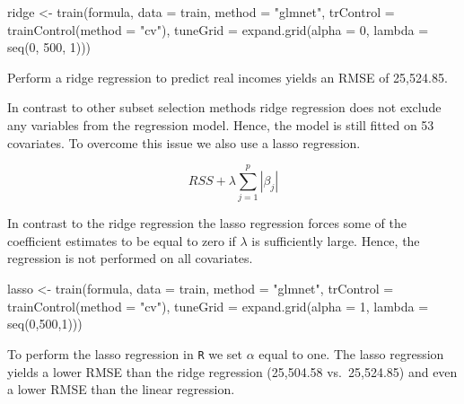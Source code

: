 \documentclass[11pt,a4paper]{article}
\newenvironment{Shaded}{\begin{snugshade}}{\end{snugshade}}
\newcommand{\AttributeTok}[1]{\textcolor[rgb]{0.77,0.63,0.00}{#1}}
\newcommand{\DecValTok}[1]{\textcolor[rgb]{0.00,0.00,0.81}{#1}}
\newcommand{\FunctionTok}[1]{\textcolor[rgb]{0.00,0.00,0.00}{#1}}
\newcommand{\NormalTok}[1]{#1}
\newcommand{\OtherTok}[1]{\textcolor[rgb]{0.56,0.35,0.01}{#1}}
\newcommand{\StringTok}[1]{\textcolor[rgb]{0.31,0.60,0.02}{#1}}
\begin{document}
\begin{Shaded}
\begin{Highlighting}[]
\NormalTok{ridge }\OtherTok{\textless{}{-}} \FunctionTok{train}\NormalTok{(formula, }\AttributeTok{data =}\NormalTok{ train,}
  \AttributeTok{method =} \StringTok{"glmnet"}\NormalTok{, }\AttributeTok{trControl =} \FunctionTok{trainControl}\NormalTok{(}\AttributeTok{method =} \StringTok{"cv"}\NormalTok{),}
  \AttributeTok{tuneGrid =} \FunctionTok{expand.grid}\NormalTok{(}\AttributeTok{alpha =} \DecValTok{0}\NormalTok{, }\AttributeTok{lambda =} \FunctionTok{seq}\NormalTok{(}\DecValTok{0}\NormalTok{, }\DecValTok{500}\NormalTok{, }\DecValTok{1}\NormalTok{))) }
\end{Highlighting}
\end{Shaded}

Perform a ridge regression to predict real incomes yields an RMSE of
25,524.85.

In contrast to other subset selection methods ridge regression does not
exclude any variables from the regression model. Hence, the model is
still fitted on 53 covariates. To overcome this issue we also use a
lasso regression.

\[
RSS + \lambda \sum^p_{j=1} | \beta_j |
\]

In contrast to the ridge regression the lasso regression forces some of
the coefficient estimates to be equal to zero if \(\lambda\) is
sufficiently large. Hence, the regression is not performed on all
covariates.

\begin{Shaded}
\begin{Highlighting}[]
\NormalTok{lasso }\OtherTok{\textless{}{-}} \FunctionTok{train}\NormalTok{(formula, }\AttributeTok{data =}\NormalTok{ train, }
       \AttributeTok{method =} \StringTok{"glmnet"}\NormalTok{, }\AttributeTok{trControl =} \FunctionTok{trainControl}\NormalTok{(}\AttributeTok{method =} \StringTok{"cv"}\NormalTok{), }
       \AttributeTok{tuneGrid =} \FunctionTok{expand.grid}\NormalTok{(}\AttributeTok{alpha =} \DecValTok{1}\NormalTok{, }\AttributeTok{lambda =} \FunctionTok{seq}\NormalTok{(}\DecValTok{0}\NormalTok{,}\DecValTok{500}\NormalTok{,}\DecValTok{1}\NormalTok{)))}
\end{Highlighting}
\end{Shaded}

To perform the lasso regression in \texttt{R} we set \(\alpha\) equal to
one. The lasso regression yields a lower RMSE than the ridge regression
(25,504.58 vs.~25,524.85) and even a lower RMSE than the linear
regression.
\end{document}
